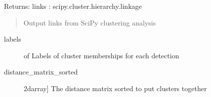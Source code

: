 \documentclass[letterpaper,10pt,english]{sphinxmanual}
\begin{document}
\begin{fulllineitems}
Returns:
links : scipy.cluster.hierarchy.linkage
\begin{quote}

Output links from SciPy clustering analysis
\end{quote}
\begin{description}
\item[{labels}] \leavevmode{[} of \sphinxcode{\sphinxupquote{int}}{]}
Labels of cluster memberships for each detection

\item[{distance\_matrix\_sorted}] \leavevmode{[}2darray{]}
The distance matrix sorted to put clusters together

\end{description}

\end{fulllineitems}

\end{document}
